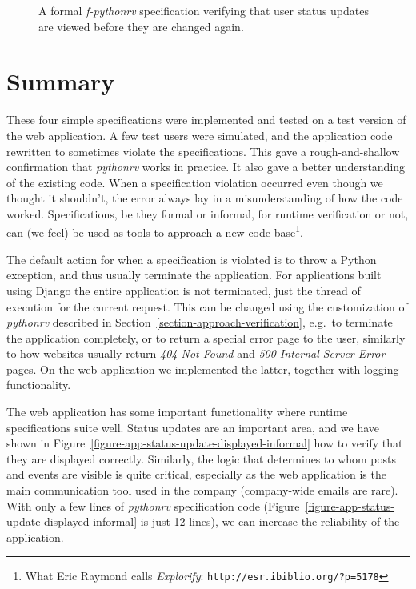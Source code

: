 \begin{figure}[h!]
	\begin{center}
	\begin{minipage}{0.9\textwidth}
	
	\end{minipage}
	\end{center}

  \caption{A formal \textit{f-pythonrv} specification verifying that user
    status updates are viewed before they are changed again.}
	\label{figure-app-status-update-viewed-formal}
\end{figure}


\section{Summary}

These four simple specifications were implemented and tested on a test version
of the web application. A few test users were simulated, and the application
code rewritten to sometimes violate the specifications. This gave a
rough-and-shallow confirmation that \textit{pythonrv} works in practice. It
also gave a better understanding of the existing code. When a specification
violation occurred even though we thought it shouldn't, the error always lay
in a misunderstanding of how the code worked. Specifications,
be they formal or informal, for runtime verification or not, can (we feel) be
used as tools to approach a new code base\footnote{What Eric Raymond calls
\textit{Explorify}: \texttt{http://esr.ibiblio.org/?p=5178}}.

The default action for when a specification is violated is to throw a Python
exception, and thus usually terminate the application. For applications built
using Django the entire application is not terminated, just the thread of
execution for the current request. This can be changed using the customization
of \textit{pythonrv} described in Section~\ref{section-approach-verification},
e.g.~to terminate the application completely, or to return a special error page
to the user, similarly to how websites usually return \textit{404 Not Found}
and \textit{500 Internal Server Error} pages. On the web application we
implemented the latter, together with logging functionality.

The web application has some important functionality where runtime
specifications suite well. Status updates are an important area, and we
have shown in Figure~\ref{figure-app-status-update-displayed-informal} how to
verify that they are displayed correctly. Similarly, the logic that
determines to whom posts and events are visible is quite critical, especially
as the web application is the main communication tool used in the company
(company-wide emails are rare). With only a few lines of \textit{pythonrv}
specification code (Figure~\ref{figure-app-status-update-displayed-informal} is
just 12 lines), we can increase the reliability of the application.
